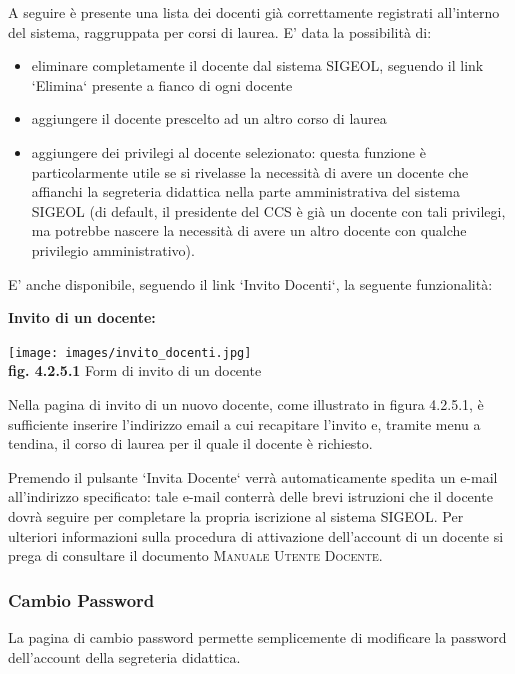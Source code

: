 \documentclass[11pt,a4paper]{article}
\begin{document}
A seguire è presente una lista dei docenti già correttamente registrati all'interno del sistema, raggruppata per corsi di laurea.
E' data la possibilità di:
\begin{itemize}
 \item eliminare completamente il docente dal sistema SIGEOL, seguendo il link `Elimina` presente a fianco di ogni docente
 \item aggiungere il docente prescelto ad un altro corso di laurea
 \item aggiungere dei privilegi al docente selezionato: questa funzione è particolarmente utile se si rivelasse la necessità di avere un docente che affianchi la segreteria didattica nella parte amministrativa del sistema SIGEOL (di default, il presidente del CCS è già un docente con tali privilegi, ma potrebbe nascere la necessità di avere un altro docente con qualche privilegio amministrativo).
\end{itemize}
E' anche disponibile, seguendo il link `Invito Docenti`, la seguente funzionalità:
\newline \newline
\begin{large}\textbf{Invito di un docente:}\end{large}

\begin{center}
	\texttt{[image: images/invito\_docenti.jpg]}\\
	\textbf{fig. 4.2.5.1} Form di invito di un docente\\
\end{center}

Nella pagina di invito di un nuovo docente, come illustrato in figura 4.2.5.1, è sufficiente inserire l'indirizzo email a cui recapitare l'invito e, tramite menu a tendina, il corso di laurea per il quale il docente è richiesto.

Premendo il pulsante `Invita Docente` verrà automaticamente spedita un e-mail all'indirizzo specificato: tale e-mail conterrà delle brevi istruzioni che il docente dovrà seguire per completare la propria iscrizione al sistema SIGEOL.
Per ulteriori informazioni sulla procedura di attivazione dell'account di un docente si prega di consultare il documento \textsc{Manuale Utente Docente}.
\subsubsection{Cambio Password}
La pagina di cambio password permette semplicemente di modificare la password dell'account della segreteria didattica.
\end{document}
